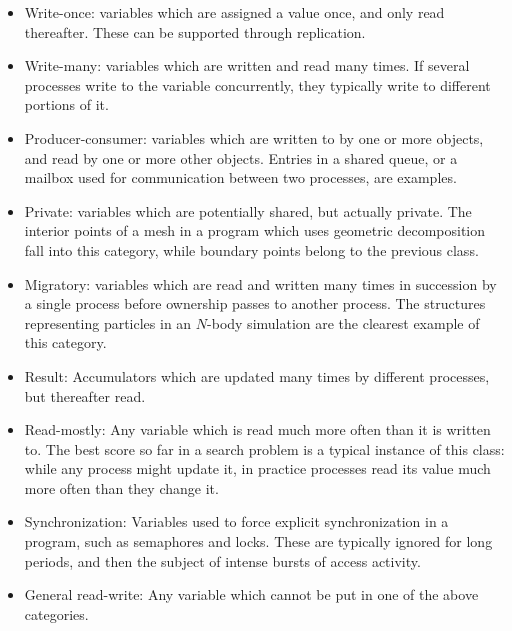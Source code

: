 \begin{itemize}
\item	Write-once:
	variables which are assigned a value once, and only read thereafter.
	These can be supported through replication.
\item	Write-many:
	variables which are written and read many times.
	If several processes write to the variable concurrently, they typically write to different portions of it.
\item	Producer-consumer:
	variables which are written to by one or more objects, and read by one or more other objects.
	Entries in a shared queue, or a mailbox used for communication between two processes, are examples.
\item	Private:
	variables which are potentially shared, but actually private.
	The interior points of a mesh in a program which uses geometric decomposition fall into this category,
	while boundary points belong to the previous class.
\item	Migratory:
	variables which are read and written many times in succession by a single process before ownership passes to another process.
	The structures representing particles in an $N$-body simulation are the clearest example of this category.
\item	Result:
	Accumulators which are updated many times by different processes, but thereafter read.
\item	Read-mostly:
	Any variable which is read much more often than it is written to.
	The best score so far in a search problem is a typical instance of this class:
	while any process might update it, in practice processes read its value much more often than they change it.
\item	Synchronization:
	Variables used to force explicit synchronization in a program, such as semaphores and locks.
	These are typically ignored for long periods, and then the subject of intense bursts of access activity.
\item	General read-write:
	Any variable which cannot be put in one of the above categories.
\end{itemize}
